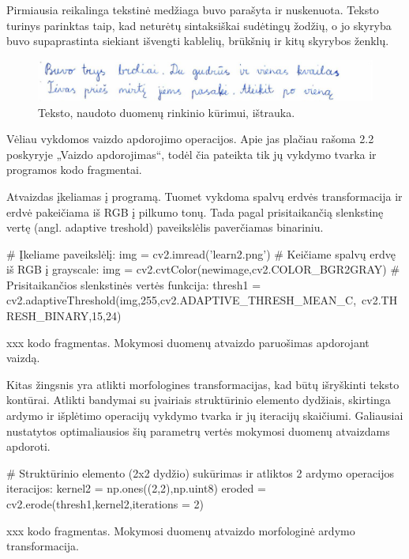 \documentclass[a4paper,12pt]{article}
\begin{document}
Pirmiausia reikalinga tekstinė medžiaga buvo parašyta ir nuskenuota. Teksto turinys parinktas taip, kad neturėtų sintaksiškai sudėtingų žodžių, o jo skyryba buvo supaprastinta siekiant išvengti kablelių, brūkšnių ir kitų skyrybos ženklų.

		\begin{figure}[H]
			\centering
			\includegraphics[scale=0.3]{images/scanned}
			\caption{Teksto, naudoto duomenų rinkinio kūrimui, ištrauka.}   %
			\label{img:scanned}
		\end{figure}

Vėliau vykdomos vaizdo apdorojimo operacijos. Apie jas plačiau rašoma 2.2 poskyryje „Vaizdo apdorojimas“, todėl čia pateikta tik jų vykdymo tvarka ir programos kodo fragmentai.

Atvaizdas įkeliamas į programą. Tuomet vykdoma spalvų erdvės transformacija ir erdvė pakeičiama iš RGB į pilkumo tonų. Tada pagal prisitaikančią slenkstinę vertę (angl. adaptive treshold) paveikslėlis paverčiamas binariniu.
	\begin{listing}[H]
\begin{pythoncode}
	# Įkeliame paveikslėlį:
	img = cv2.imread('learn2.png')
	# Keičiame spalvų erdvę iš RGB į grayscale:
	img = cv2.cvtColor(newimage,cv2.COLOR_BGR2GRAY)
	# Prisitaikančios slenkstinės vertės funkcija:
	thresh1 = cv2.adaptiveThreshold(img,255,cv2.ADAPTIVE_THRESH_MEAN_C,\
		cv2.THRESH_BINARY,15,24)
\end{pythoncode}
		\begin{center}
			xxx kodo fragmentas. Mokymosi duomenų atvaizdo paruošimas apdorojant vaizdą.
		\end{center}		
	\end{listing}

Kitas žingsnis yra atlikti morfologines transformacijas, kad būtų išryškinti teksto kontūrai. Atlikti bandymai su įvairiais struktūrinio elemento dydžiais, skirtinga ardymo ir išplėtimo operacijų vykdymo tvarka ir jų iteracijų skaičiumi. Galiausiai nustatytos optimaliausios šių parametrų vertės mokymosi duomenų atvaizdams apdoroti.
	\begin{listing}[H]
\begin{pythoncode}
	# Struktūrinio elemento (2x2 dydžio) sukūrimas ir atliktos 2 ardymo operacijos iteracijos: 
	kernel2 = np.ones((2,2),np.uint8)		
	eroded = cv2.erode(thresh1,kernel2,iterations = 2)
\end{pythoncode}
		\begin{center}
			xxx kodo fragmentas. Mokymosi duomenų atvaizdo morfologinė ardymo transformacija.
		\end{center}		
	\end{listing}
\end{document}
